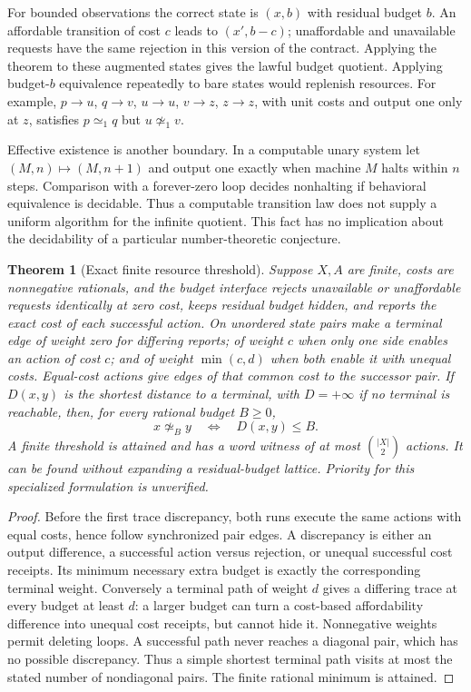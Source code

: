 \documentclass[11pt]{article}
\newtheorem{theorem}{Theorem}
\begin{document}
For bounded observations the correct state is $(x,b)$ with residual budget
$b$. An affordable transition of cost $c$ leads to $(x',b-c)$; unaffordable
and unavailable requests have the same rejection in this version of the
contract. Applying the theorem to these augmented states gives the lawful
budget quotient. Applying budget-$b$ equivalence repeatedly to bare states
would replenish resources. For example, $p\to u$, $q\to v$, $u\to u$,
$v\to z$, $z\to z$, with unit costs and output one only at $z$, satisfies
$p\simeq_1q$ but $u\not\simeq_1v$.

Effective existence is another boundary. In a computable unary system let
$(M,n)\mapsto(M,n+1)$ and output one exactly when machine $M$ halts within
$n$ steps. Comparison with a forever-zero loop decides nonhalting if
behavioral equivalence is decidable. Thus a computable transition law does
not supply a uniform algorithm for the infinite quotient. This fact has no
implication about the decidability of a particular number-theoretic conjecture.

\begin{theorem}[Exact finite resource threshold]
Suppose $X,A$ are finite, costs are nonnegative rationals, and the budget
interface rejects unavailable or unaffordable requests identically at zero cost,
keeps residual budget hidden, and
reports the exact cost of each successful action. On unordered state pairs
make a terminal edge of weight zero for differing reports; of weight $c$
when only one side enables an action of cost $c$; and of weight
$\min(c,d)$ when both enable it with unequal costs. Equal-cost actions give
edges of that common cost to the successor pair. If $D(x,y)$ is the shortest
distance to a terminal, with $D=+\infty$ if no terminal is reachable, then,
for every rational budget $B\ge0$,
\[
x\not\simeq_B y\quad\Longleftrightarrow\quad D(x,y)\le B.
\]
A finite threshold is attained and has a word witness of at most
$\binom{|X|}{2}$ actions. It can be found without expanding a residual-budget
lattice. Priority for this specialized formulation is unverified.
\end{theorem}
\begin{proof}
Before the first trace discrepancy, both runs execute the same actions with
equal costs, hence follow synchronized pair edges. A discrepancy is either
an output difference, a successful action versus rejection, or unequal
successful cost receipts. Its minimum necessary extra budget is exactly the
corresponding terminal weight. Conversely a terminal path of weight $d$
gives a differing trace at every budget at least $d$: a larger budget can
turn a cost-based affordability difference into unequal cost receipts, but
cannot hide it. Nonnegative weights permit deleting loops. A successful
path never reaches a diagonal pair, which has no possible discrepancy.
Thus a simple shortest terminal path visits at most the stated number of
nondiagonal pairs. The finite rational minimum is attained.
\end{proof}
\end{document}
